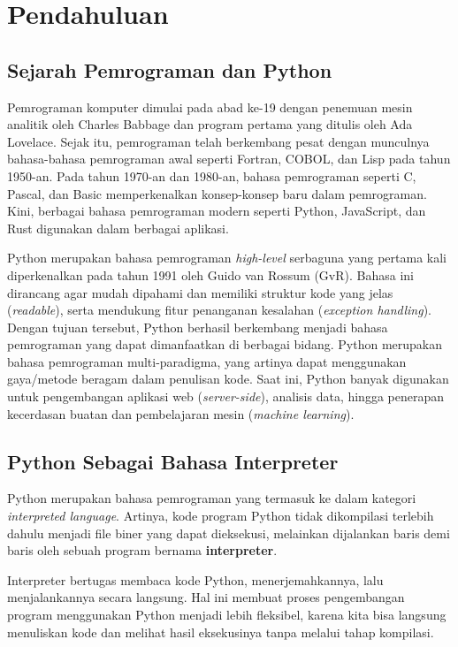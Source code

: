 \chapter{Pendahuluan}

\section{Sejarah Pemrograman dan Python}

Pemrograman komputer dimulai pada abad ke-19 dengan penemuan mesin analitik oleh Charles Babbage dan program pertama yang ditulis oleh Ada Lovelace. Sejak itu, pemrograman telah berkembang pesat dengan munculnya bahasa-bahasa pemrograman awal seperti Fortran, COBOL, dan Lisp pada tahun 1950-an. Pada tahun 1970-an dan 1980-an, bahasa pemrograman seperti C, Pascal, dan Basic memperkenalkan konsep-konsep baru dalam pemrograman. Kini, berbagai bahasa pemrograman modern seperti Python, JavaScript, dan Rust digunakan dalam berbagai aplikasi.

Python merupakan bahasa pemrograman \textit{high-level} serbaguna yang pertama kali diperkenalkan pada tahun 1991 oleh Guido van Rossum (GvR). Bahasa ini dirancang agar mudah dipahami dan memiliki struktur kode yang jelas (\textit{readable}), serta mendukung fitur penanganan kesalahan (\textit{exception handling}). Dengan tujuan tersebut, Python berhasil berkembang menjadi bahasa pemrograman yang dapat dimanfaatkan di berbagai bidang. Python merupakan bahasa pemrograman multi-paradigma, yang artinya dapat menggunakan gaya/metode beragam dalam penulisan kode. Saat ini, Python banyak digunakan untuk pengembangan aplikasi web (\textit{server-side}), analisis data, hingga penerapan kecerdasan buatan dan pembelajaran mesin (\textit{machine learning}).

\section{Python Sebagai Bahasa Interpreter}
Python merupakan bahasa pemrograman yang termasuk ke dalam kategori
\textit{interpreted language}. Artinya, kode program Python tidak
dikompilasi terlebih dahulu menjadi file biner yang dapat dieksekusi,
melainkan dijalankan baris demi baris oleh sebuah program bernama
\textbf{interpreter}.

Interpreter bertugas membaca kode Python, menerjemahkannya, lalu
menjalankannya secara langsung. Hal ini membuat proses pengembangan
program menggunakan Python menjadi lebih fleksibel, karena kita bisa
langsung menuliskan kode dan melihat hasil eksekusinya tanpa melalui
tahap kompilasi.

